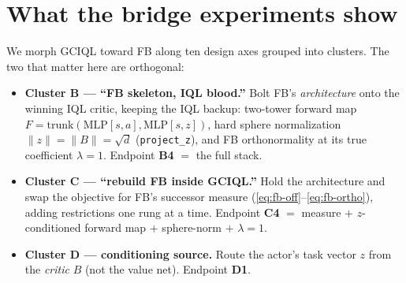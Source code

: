 \documentclass[11pt]{article}
\newcommand{\Fmap}{F}                                %
\newcommand{\Bmap}{B}                                %
\begin{document}
\section{What the bridge experiments show}

We morph GCIQL toward FB along ten design axes grouped into clusters. The two
that matter here are orthogonal:
\begin{itemize}[leftmargin=1.4em,itemsep=2pt]
  \item \textbf{Cluster B --- ``FB skeleton, IQL blood.''} Bolt FB's
        \emph{architecture} onto the winning IQL critic, keeping the IQL backup:
        two-tower forward map $\Fmap=\mathrm{trunk}(\mathrm{MLP}[s,a],\mathrm{MLP}[s,z])$,
        hard sphere normalization $\lVert z\rVert=\lVert\Bmap\rVert=\sqrt d$
        (\texttt{project\_z}), and FB orthonormality at its true coefficient
        $\lambda=1$. Endpoint \textbf{B4} $=$ the full stack.
  \item \textbf{Cluster C --- ``rebuild FB inside GCIQL.''} Hold the architecture
        and swap the objective for FB's successor measure
        (\ref{eq:fb-off}--\ref{eq:fb-ortho}), adding restrictions one rung at a
        time. Endpoint \textbf{C4} $=$ measure $+$ $z$-conditioned forward map
        $+$ sphere-norm $+$ $\lambda=1$.
  \item \textbf{Cluster D --- conditioning source.} Route the actor's task
        vector $z$ from the \emph{critic} $\Bmap$ (not the value net). Endpoint
        \textbf{D1}.
\end{itemize}
\end{document}
